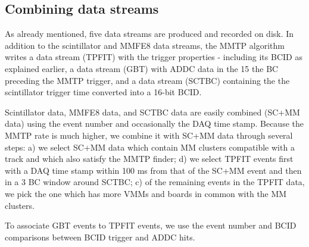 \subsection{Combining data streams}
\label{sec:data-streams}
As already mentioned, five data streams are produced and recorded on disk. In addition  to the scintillator and MMFE8 data streams,
the MMTP algorithm writes a data stream (TPFIT) with the trigger properties - including its BCID  as explained earlier,
 a data stream (GBT) with ADDC data in the 15 the BC preceding the
MMTP 
trigger, and a data stream (SCTBC) containing  the the scintillator trigger time converted into a 16-bit  BCID. 

Scintillator data, MMFE8 data, and  SCTBC data
 are easily combined (SC+MM data) using the event number and occasionally the DAQ time stamp.
Because the MMTP rate is much higher, we combine it with  SC+MM data through several steps: a) we select SC+MM data which contain MM clusters
 compatible with a track
and which also satisfy the MMTP finder; d) we select TPFIT events first with a DAQ time stamp within 100 ms from that of the SC+MM event and then
in a 3 BC window around SCTBC; c) of the remaining events in the TPFIT data, we pick the one which has more VMMs and boards in common with the MM clusters.

To associate GBT events to TPFIT events, we use the event number and BCID comparisons between BCID  trigger and ADDC hits.


